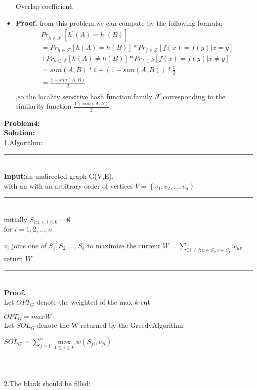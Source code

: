 \documentclass{article}
\begin{document}
\begin{itemize}
    Overlap coefficient.
    \item \textbf{Proof.} from this problem,we can compute by the following formula:$$
    \begin{aligned}
        &Pr_{h \in \mathcal{F^\prime}}[h^\prime(A) = h^\prime(B)]\\
        &=Pr_{h \in \mathcal{F}}[h(A) = h(B)] * Pr_{f \in \mathcal{B}}[f(x) = f(y) | x = y] \\&+ Pr_{h \in \mathcal{F}}[h(A) \neq h(B)] * Pr_{f \in \mathcal{B}}[f(x) = f(y) | x \neq y]\\
        &=sim(A,B)*1 + (1 - sim(A,B)) * \frac{1}{2}\\
        &=\frac{1 + sim(A,B)}{2}\\
    \end{aligned}$$,so the locality sensitive hash function family $\mathcal{F^\prime}$corresponding to the similarity function $\frac{1 + sim(A,B)}{2}$.
\end{itemize}
\newpage \noindent\textbf{Problem4:}\\ \textbf{Solution:}\\
1.Algorithm:\\
    \rule[0.05\baselineskip]{12cm}{1pt}\\
    \textbf{Input:}an undirected graph G(V,E),\\with an with an arbitrary order of vertices $V = \left\{v_1,v_2,...,v_n\right\}$ \\
    \rule[-0.05\baselineskip]{12cm}{1pt}\\
    initially $S_{i:1 \leq i \leq k} = \emptyset$\\
    for $i = 1,2,...,n$

    $v_i$ joins one of $S_1,S_2,...,S_k$ to maximize the current $W = \sum_{\exists i \neq j:u\in S_i,v\in S_j}w_{uv}$\\
 return $W$\\
 \rule[-0.05\baselineskip]{12cm}{1pt}\\
 \textbf{Proof.}\\
 Let $OPT_G$ denote the weighted of the max $k$-cut

 $OPT_G = maxW$\\
 Let $SOL_G$ denote the W returned by the GreedyAlgorithm

 $SOL_G = \sum_{j=1}^{n}\mathop{max}\limits_{1 \leq i \leq k}w(S_{ji},v_{ji})$\\
 \\ \\ \\
 2.The blank should be filled:
\end{document}

